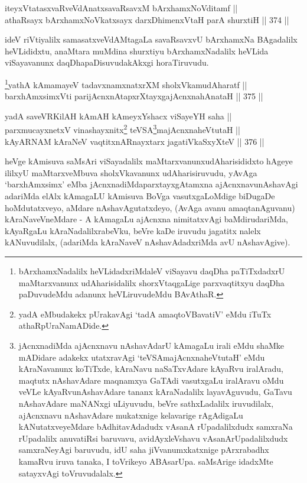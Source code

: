 \begin{shl}
iteyxVtatasxvaRveVdAnatxsavaRsavxM bArxhamxNoVditamf || \\
athaRsayx bArxhamxNoVkatxsayx darxDhimenxV\s taH parA shurxtiH \hfill || 374 ||  
\end{shl}

\begin{artha}
ideV riVtiyalilx samasatxveVdAMtagaLa savaRsavxvU bArxhamxNa
BAgadalilx heVLididxtu, anaMtara muMdina shurxtiyu bArxhamxNadalilx
heVLida viSayavanunx daqDhapaDisuvudakAkxgi horaTiruvudu.
\end{artha}


\begin{shl}
\footnote{bArxhamxNadalilx heVLidadxriMdaleV viSayavu daqDha paTiTxdadxrU maMtarxvanunx udAharisidalilx shorxVtaqgaLige parxvaqtitxyu daqDha paDuvudeMdu adanunx heVLiruvudeMdu BAvAthaR.}yathA kAmamayeV tadavxnamxnatxrXM sholxVkamudAharatf || \\
barxhAmxsimxVti parijAcnxnAtapxrXtayxgajAcnxnahAnataH \hfill || 375 ||  
\end{shl}

\begin{shl}
yadA saveVR\s KilAH kAmAH kAmeyxYshacx viSayeYH saha || \\
parxmucayxnetxV vinashayxnitx\footnote{yadA eMbudakekx pUrakavAgi `tadA amaqtoVBavatiV' eMdu iTuTx athaRpUraNamADide.} teVSA\footnote{jAcnxnadiMda ajAcnxnavu nAshavAdarU kAmagaLu irali eMdu shaMke mADidare adakekx utatxravAgi `teVSAmajAcnxnaheVtutaH' eMdu kAraNavanunx koTiTxde, kAraNavu naSaTxvAdare kAyaRvu iralAradu, maqtutx nAshavAdare maqnamxya GaTAdi vasutxgaLu iralAravu oMdu veVLe kAyaRvunAshavAdare tananx kAraNadalilx layavAguvudu, GaTavu nAshavAdare maNANxgi uLiyuvudu, beVre sathxLadalilx iruvudilalx, ajAcnxnavu nAshavAdare mukatxnige kelavarige rAgAdigaLu kANutatxveyeMdare bAdhitavAdadudx vAsanA rUpadalilxdudx samxraNa rUpadalilx anuvatiRsi baruvavu, avidAyxleVshavu vAsanArUpadalilxdudx samxraNeyAgi baruvudu, idU saha jiVvanumxkatxnige pArxrabadhx kamaRvu iruva tanaka, I toVrikeyo ABAsarUpa. saMsArige idadxMte satayxvAgi toVruvudalalx.}majAcnxnaheVtutaH || \\
kAyARNAM kAraNeV vaqtitxnARnayxtarx jagatiVkaSxyXteV \hfill || 376 ||  
\end{shl}

\begin{artha}
heVge kAmisuva saMsAri viSayadalilx maMtarxvanunx\break udAharisididxto
hAgeye ililxyU maMtarxveMbuva sholxVkavanunx udAharisiruvudu, yAvAga
`barxhAmxsimx' eMba jAcnxnadiMda\break parxtayxgAtamxna ajAcnxnavunAshavAgi
adariMda elAlx kAmagaLU kAmisuva BoVga vasutxgaLoMdige biDugaDe
hoMdutatxveyo, aMdare nAshavAgutatxdeyo, (AvAga avanu amaqtanAguvanu)
kAraNaveVneMdare - A kAmagaLu ajAcnxna nimitatxvAgi baMdirudariMda,
kAyaRgaLu kAraNadalilxrabeVku, beVre kaDe iruvudu jagatitx nalelx
kANuvudilalx, (adariMda kAraNaveV nAshavAdadxriMda avU nAshavAgive).
\end{artha}

